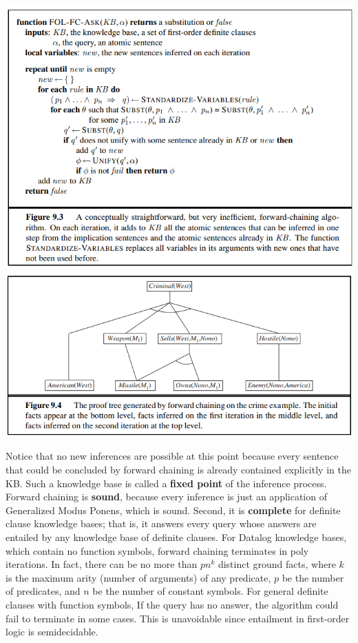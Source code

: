 \begin{center}
    \includegraphics[]{images/FOL-FC.png}
    \includegraphics[]{images/FOL-FC proof tree.png}
\end{center}
Notice that no new inferences are possible at this point because every sentence that could be concluded by forward chaining is already
contained explicitly in the KB. Such a knowledge base is called a \textbf{fixed point} of the inference process.\newline\newline
Forward chaining is \textbf{sound}, because every inference is just an
application of Generalized Modus Ponens, which is sound. Second, it is \textbf{complete} for definite clause knowledge bases; that is, it answers every query whose answers are entailed by any knowledge base of definite clauses.\newline\newline
For Datalog knowledge bases, which contain no function symbols, forward chaining terminates in poly iterations. In fact, there can be no more than $pn^k$ distinct ground facts, where $k$ is  the maximum arity (number of arguments) of any predicate, $p$ be the number of predicates, and $n$ be the number of constant symbols.\newline\newline
For general definite clauses with function symbols, If the query has no answer, the algorithm could fail to terminate in some cases. This is unavoidable since entailment in first-order logic is semidecidable.

